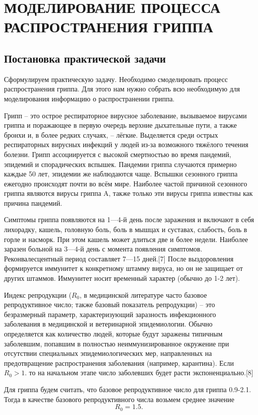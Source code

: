\documentclass[a4paper, 14pt]{extreport}
\begin{document}
	
	\newpage
	\chapter{МОДЕЛИРОВАНИЕ ПРОЦЕССА РАСПРОСТРАНЕНИЯ ГРИППА}
	\section{Постановка практической задачи}
	Сформулируем практическую задачу. Необходимо смоделировать процесс распространения гриппа. Для этого нам нужно собрать всю необходимую для моделирования информацию о распространении гриппа.
	
	Грипп -- это острое респираторное вирусное заболевание, вызываемое вирусами гриппа и поражающее в первую очередь верхние дыхательные пути, а также бронхи и, в более редких случаях, -- лёгкие. Выделяется среди острых респираторных вирусных инфекций у людей из-за возможного тяжёлого течения болезни. Грипп ассоциируется с высокой смертностью во время пандемий, эпидемий и спорадических вспышек. Пандемии гриппа случаются примерно каждые 50 лет, эпидемии же наблюдаются чаще. Вспышки сезонного гриппа ежегодно происходят почти во всём мире. Наиболее частой причиной сезонного гриппа являются вирусы гриппа A, также только эти вирусы гриппа известны как причина пандемий.
	
	Симптомы гриппа появляются на 1—4-й день после заражения и включают в себя лихорадку, кашель, головную боль, боль в мышцах и суставах, слабость, боль в горле и насморк. При этом кашель может длиться две и более недели. Наиболее заразен больной на 3—4-й день с момента появления симптомов. Реконвалесцентный период составляет 7—15 дней.[7] После выздоровления формируется иммунитет к конкретному штамму вируса, но он не защищает от других штаммов. Иммунитет носит временный характер (обычно до 1-2 лет).
	
	Индекс репродукции ($R_{0}$, в медицинской литературе часто базовое репродуктивное число; также базовый показатель репродукции) -- это безразмерный параметр, характеризующий заразность инфекционного заболевания в медицинской и ветеринарной эпидемиологии. Обычно определяется как количество людей, которые будут заражены типичным заболевшим, попавшим в полностью неиммунизированное окружение при отсутствии специальных эпидемиологических мер, направленных на предотвращение распространения заболевания (например, карантина). Если $R_0 > 1$. то на начальном этапе число заболевших будет расти экспоненциально.[8]
	
	Для гриппа будем считать, что базовое репродуктивное число для гриппа 0.9-2.1. Тогда в качестве базового репродуктивного числа возьмем среднее значение $$R_0 = 1.5.$$
\end{document}
